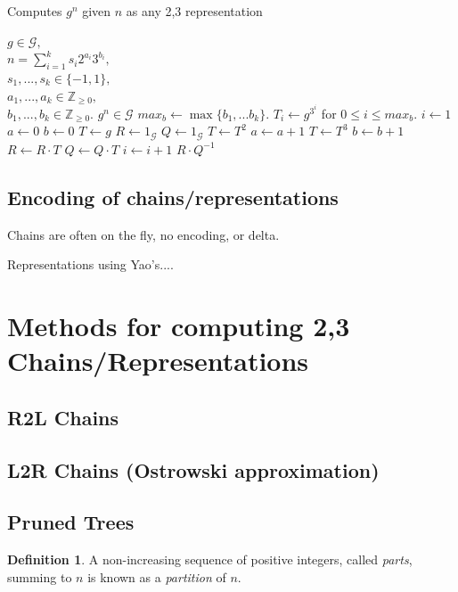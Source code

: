 \documentclass{ucalgthes1}
\theoremstyle{plain}
\theoremstyle{definition}
\newtheorem{defn}[thm]{Definition}
\newcommand{\ZZgez}{\mathbb{Z}_{\ge 0}}
\begin{document}
\begin{algorithm}[h]
\caption{Computes $g^n$ given $n$ as any 2,3 representation}\label{alg:yaos}
\begin{algorithmic}[1]
\REQUIRE $g \in \mathcal G,$ \\
$n = \sum_{i=1}^k s_i2^{a_i}3^{b_i},$ \\
$s_1,...,s_k \in \{-1, 1\},$ \\
$a_1,...,a_k \in \ZZgez,$ \\
$b_1,...,b_k \in \ZZgez.$
\ENSURE $g^n \in \mathcal G$
\STATE $max_b \gets \max \{ b_1, ... b_k \}$.
\STATE $T_i \gets g^{3^i}$ for $0 \le i \le max_b$.
\STATE $i \gets 1$
\STATE $a \gets 0$ 
\STATE $b \gets 0$ 
\STATE $T \gets g$ 
\STATE $R \gets 1_{\mathcal G}$ 
\STATE $Q \gets 1_{\mathcal G}$ 
		\STATE $T \gets T^2$
		\STATE $a \gets a + 1$
	\ENDWHILE
		\STATE $T \gets T^3$
		\STATE $b \gets b + 1$
	\ENDWHILE
		\STATE $R \gets R \cdot T$
	\ELSE
		\STATE $Q \gets Q \cdot T$
	\ENDIF
	\STATE $i \gets i + 1$
\ENDWHILE
\RETURN $R \cdot Q^{-1}$
\end{algorithmic}
\end{algorithm}




\bigbreak
\subsection{Encoding of chains/representations}

Chains are often on the fly, no encoding, or delta.

Representations using Yao's....


\pagebreak
\bigbreak
\section{Methods for computing 2,3 Chains/Representations}\label{section:dbnsMethods}

\bigbreak
\subsection{R2L Chains}

\bigbreak
\subsection{L2R Chains (Ostrowski approximation)}

\bigbreak
\subsection{Pruned Trees}




\begin{defn}
A non-increasing sequence of positive integers, called \emph{parts}, summing to $n$ is known as a \emph{partition} of $n$.
\end{defn}
\end{document}
